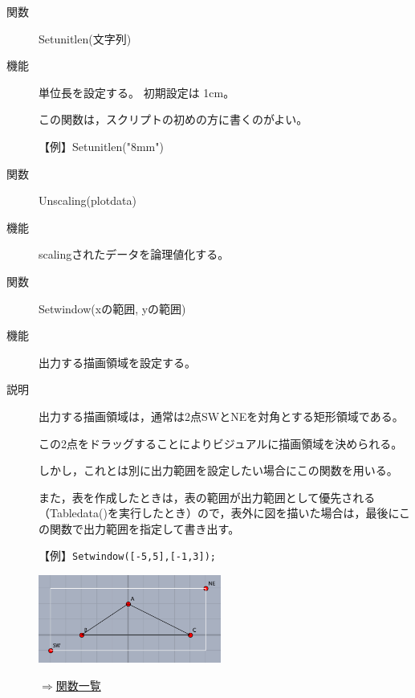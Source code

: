 \documentclass[papersize,a4paper,10pt,uplatex]{jsarticle}
\begin{document}
\begin{description}
\vspace{\baselineskip}
\hypertarget{setunitlen}{}
\item[関数]Setunitlen(文字列)
\item[機能]単位長を設定する。 初期設定は 1cm。

この関数は，スクリプトの初めの方に書くのがよい。

【例】Setunitlen("8mm")

\vspace{\baselineskip}

\hypertarget{unscaling}{}
\item[関数]Unscaling(plotdata)
\item[機能]scalingされたデータを論理値化する。

\vspace{\baselineskip}
\hypertarget{setwindow}{}
\item[関数]Setwindow(xの範囲, yの範囲)
\item[機能]出力する描画領域を設定する。
\item[説明]出力する描画領域は，通常は2点SWとNEを対角とする矩形領域である。

この2点をドラッグすることによりビジュアルに描画領域を決められる。

しかし，これとは別に出力範囲を設定したい場合にこの関数を用いる。

また，表を作成したときは，表の範囲が出力範囲として優先される（Tabledata()を実行したとき）ので，表外に図を描いた場合は，最後にこの関数で出力範囲を指定して書き出す。

\vspace{\baselineskip}
【例】\verb|Setwindow([-5,5],[-1,3]);|

\vspace{\baselineskip}
\hspace{10mm}\includegraphics[bb=0.00 0.00 415.02 199.01,width=6cm]{Fig/setwindow.pdf} 

\begin{flushright}\hyperlink{functionlist}{$\Rightarrow$関数一覧}\end{flushright}

\end{description}

\end{document}
